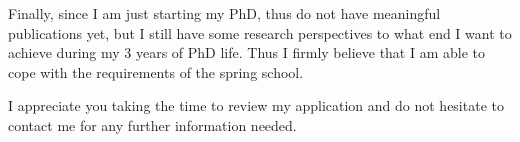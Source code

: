 \documentclass[11pt,a4paper,sans]{moderncv} %
\begin{document}
Finally, since I am just starting my PhD, thus do not have meaningful publications yet, but I still have some research perspectives to what end I want to achieve during my 3 years of PhD life. Thus I firmly believe that I am able to cope with the requirements of the spring school.

I appreciate you taking the time to review my application and do not hesitate to contact me for any further information needed.

\makeletterclosing %

%
%
%
%
%
%
%
%
%
\end{document}
